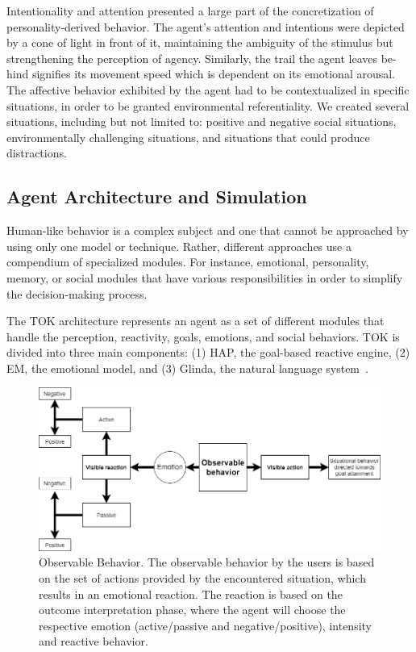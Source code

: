Intentionality and attention presented a large part of the concretization of personality-derived behavior. The agent’s attention and intentions were depicted by a cone of light in front of it, maintaining the ambiguity of the stimulus but strengthening the perception of agency. Similarly, the trail the agent leaves be- hind signifies its movement speed which is dependent on its emotional arousal. The affective behavior exhibited by the agent had to be contextualized in specific situations, in order to be granted environmental referentiality. We created several situations, including but not limited to: positive and negative social situations, environmentally challenging situations, and situations that could produce distractions.

\subsection{Agent Architecture and Simulation}

Human-like behavior is a complex subject and one that cannot be approached by using only one model or technique. Rather, different approaches use a compendium of specialized modules. For instance, emotional, personality, memory, or social modules that have various responsibilities in order to simplify the decision-making process.

The TOK architecture represents an agent as a set of different modules that handle the perception, reactivity, goals, emotions, and social behaviors. TOK is divided into three main components: (1) HAP, the goal-based reactive engine, (2) EM, the emotional model, and (3) Glinda, the natural language system~.

\begin{figure}[ht!]
\centerline{\includegraphics[width=\textwidth]{big-figure.png}}
\caption{Observable Behavior. The observable behavior by the users is based on the set of actions provided by the encountered situation, which results in an emotional reaction. The reaction is based on the outcome interpretation phase, where the agent will choose the respective emotion (active/passive and negative/positive), intensity and reactive behavior.}
\label{figs:observableBehavior}
\end{figure}

